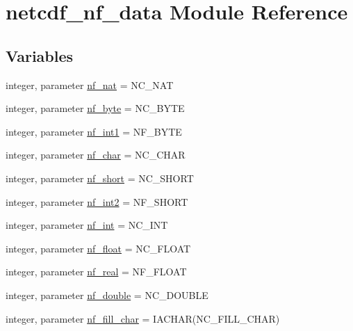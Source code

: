 \hypertarget{namespacenetcdf__nf__data}{}\section{netcdf\+\_\+nf\+\_\+data Module Reference}
\label{namespacenetcdf__nf__data}
\subsection*{Variables}
\begin{DoxyCompactItemize}
\item 
integer, parameter \hyperlink{namespacenetcdf__nf__data_a65b9ee2a9891b0be19394591f2c7d4bb}{nf\+\_\+nat} = N\+C\+\_\+\+N\+AT
\item 
integer, parameter \hyperlink{namespacenetcdf__nf__data_aec7b780370a3df9dc9822bcece408c1d}{nf\+\_\+byte} = N\+C\+\_\+\+B\+Y\+TE
\item 
integer, parameter \hyperlink{namespacenetcdf__nf__data_ad2132fc0056f1513a97f7c34f8b4b88d}{nf\+\_\+int1} = N\+F\+\_\+\+B\+Y\+TE
\item 
integer, parameter \hyperlink{namespacenetcdf__nf__data_af5efdb595b5f85635d7473630c9edfcf}{nf\+\_\+char} = N\+C\+\_\+\+C\+H\+AR
\item 
integer, parameter \hyperlink{namespacenetcdf__nf__data_adbccf2bc893d5aaf8de60224f39f67a8}{nf\+\_\+short} = N\+C\+\_\+\+S\+H\+O\+RT
\item 
integer, parameter \hyperlink{namespacenetcdf__nf__data_af796638afaa1f6ee28d04cc81d730376}{nf\+\_\+int2} = N\+F\+\_\+\+S\+H\+O\+RT
\item 
integer, parameter \hyperlink{namespacenetcdf__nf__data_a8bf2bf336581ce0275f24b0d2174ee6d}{nf\+\_\+int} = N\+C\+\_\+\+I\+NT
\item 
integer, parameter \hyperlink{namespacenetcdf__nf__data_a278e4bcb76b4a6ede0f2d5ce6774ef64}{nf\+\_\+float} = N\+C\+\_\+\+F\+L\+O\+AT
\item 
integer, parameter \hyperlink{namespacenetcdf__nf__data_a1d9182cde0ed15fe455e016e1c7f4ff4}{nf\+\_\+real} = N\+F\+\_\+\+F\+L\+O\+AT
\item 
integer, parameter \hyperlink{namespacenetcdf__nf__data_af52bf12a2c816e49939cbbfe60feb6ce}{nf\+\_\+double} = N\+C\+\_\+\+D\+O\+U\+B\+LE
\item 
integer, parameter \hyperlink{namespacenetcdf__nf__data_a81421f9927af1630f1a42f305fc0308f}{nf\+\_\+fill\+\_\+char} = I\+A\+C\+H\+AR(N\+C\+\_\+\+F\+I\+L\+L\+\_\+\+C\+H\+AR)
\item 

\end{DoxyCompactItemize}

